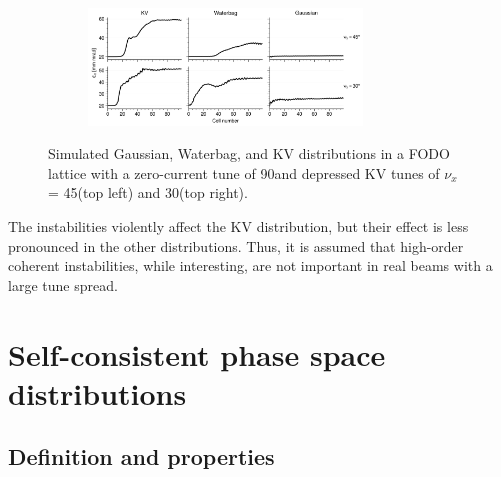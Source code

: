 \begin{figure}[!p]
\begin{subfigure}[b]{0.45\textwidth}
        \label{fig:f2}
    \end{subfigure}
    \vfill
    \begin{subfigure}[b]{\textwidth}
        \centering
        \includegraphics[width=0.8\textwidth]{Images/chapter1/coherent_instability_emittances.png}
        \label{fig:coherent_instabilities_b}
    \end{subfigure}
    \caption{Simulated Gaussian, Waterbag, and KV distributions in a FODO lattice with a zero-current tune of 90\degree and depressed KV tunes of $\nu_x$ = 45\degree (top left) and 30\degree (top right).}
    \label{fig:coherent_instabilities}
\end{figure}
%
The instabilities violently affect the KV distribution, but their effect is less pronounced in the other distributions. Thus, it is assumed that high-order coherent instabilities, while interesting, are not important in real beams with a large tune spread. 



\section{Self-consistent phase space distributions}\label{sec:Self-consistent phase space distributions}

\subsection{Definition and properties}

